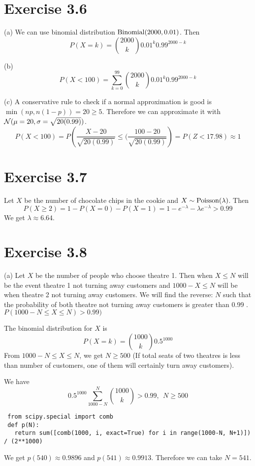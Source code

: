 \documentclass[12pt]{article}
\begin{document}
\section*{Exercise 3.6}
(a) We can use binomial distribution $\mathrm{Binomial} (2000, 0.01)$. Then
$$ P(X= k) = {2000 \choose k} 0.01^k  0.99^{2000 -k }$$

(b) $$ P(X < 100) = \sum^{99}_{k=0} {2000 \choose k} 0.01^k  0.99^{2000 -k } $$

(c) A conservative rule to check if a normal approximation is good is $\min (np, n(1-p)) = 20 \geq 5$. Therefore we can approximate it with $\mathcal{N} (\mu=20, \sigma = \sqrt{20(0.99)}) $.
$$P ( X < 100) = P \left(\frac{X - 20}{\sqrt{20(0.99)}} \leq (\frac{100 - 20}{\sqrt{20(0.99)}}\right) = P(Z < 17.98) \approx 1 $$

\section*{Exercise 3.7}
Let $X$ be the number of chocolate chips in the cookie and $X \sim \mathrm{Poisson} (\lambda)$. Then 
$$P(X \geq 2 ) = 1 - P(X = 0) - P(X = 1) = 1 - e^{-\lambda} - \lambda e^{-\lambda} > 0.99$$
We get $\lambda \approx 6.64$.

\section*{Exercise 3.8}
(a) Let $X$ be the number of people who choose theatre 1. Then when $X \leq N$ will be the event theatre 1 not turning away customers and $1000 - X \leq N$ will be when theatre 2 not turning away customers.
We will find the reverse: $N$ such that the probability of both theatre not turning away customers is greater than 0.99 .  $P(1000 -N \leq X \leq N) > 0.99)$

The binomial distribution for $X$ is $$ P(X = k) = {1000 \choose k} 0.5^{1000}$$
From $1000 -N \leq X \leq N$, we get $N \geq 500$ (If total seats of two theatres is less than number of customers, one of them will certainly turn away customers).

We have
$$ 0.5^{1000} \sum^{N}_{1000-N} {1000 \choose k} > 0.99, \ \ N \geq 500$$
\begin{lstlisting}
 from scipy.special import comb
 def p(N):
   return sum([comb(1000, i, exact=True) for i in range(1000-N, N+1)]) / (2**1000)
\end{lstlisting}
We get $p(540) \approx 0.9896$ and $p(541) \approx 0.9913$. Therefore we can take $N = 541$.
\end{document}
